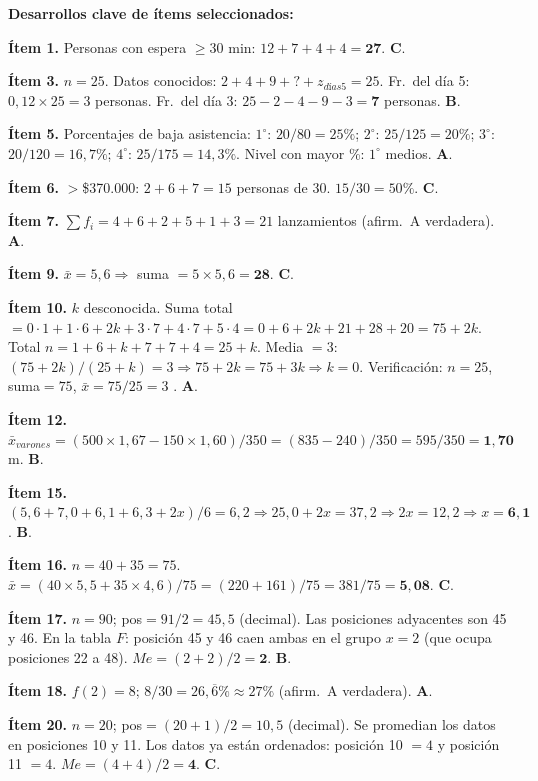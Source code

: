 \documentclass[11pt, letterpaper]{article}
\begin{document}
\medskip

\textbf{Desarrollos clave de ítems seleccionados:}

\medskip

\textbf{Ítem 1.} Personas con espera $\geq30$ min: $12+7+4+4=\mathbf{27}$. \textbf{C}.

\textbf{Ítem 3.} $n=25$. Datos conocidos: $2+4+9+?+z_{días5}=25$. Fr.\ del día 5: $0{,}12\times25=3$ personas. Fr.\ del día 3: $25-2-4-9-3=\mathbf{7}$ personas. \textbf{B}.

\textbf{Ítem 5.} Porcentajes de baja asistencia: $1^\circ$: $20/80=25\%$; $2^\circ$: $25/125=20\%$; $3^\circ$: $20/120=16{,}7\%$; $4^\circ$: $25/175=14{,}3\%$. Nivel con mayor \%: $1^\circ$ medios. \textbf{A}.

\textbf{Ítem 6.} $>$\$370.000: $2+6+7=15$ personas de 30. $15/30=50\%$. \textbf{C}.

\textbf{Ítem 7.} $\sum f_i = 4+6+2+5+1+3=21$ lanzamientos (afirm.\ A verdadera). \textbf{A}.

\textbf{Ítem 9.} $\bar{x}=5{,}6 \Rightarrow$ suma $=5\times5{,}6=\mathbf{28}$. \textbf{C}.

\textbf{Ítem 10.} $k$ desconocida. Suma total $= 0\cdot1+1\cdot6+2k+3\cdot7+4\cdot7+5\cdot4 = 0+6+2k+21+28+20=75+2k$. Total $n=1+6+k+7+7+4=25+k$. Media $=3$: $(75+2k)/(25+k)=3 \Rightarrow 75+2k=75+3k \Rightarrow k=0$. Verificación: $n=25$, suma$=75$, $\bar{x}=75/25=3$ \checkmark. \textbf{A}.

\textbf{Ítem 12.} $\bar{x}_{varones}=(500\times1{,}67-150\times1{,}60)/350=(835-240)/350=595/350=\mathbf{1{,}70}$ m. \textbf{B}.

\textbf{Ítem 15.} $(5{,}6+7{,}0+6{,}1+6{,}3+2x)/6=6{,}2 \Rightarrow 25{,}0+2x=37{,}2 \Rightarrow 2x=12{,}2 \Rightarrow x=\mathbf{6{,}1}$. \textbf{B}.

\textbf{Ítem 16.} $n=40+35=75$. $\bar{x}=(40\times5{,}5+35\times4{,}6)/75=(220+161)/75=381/75=\mathbf{5{,}08}$. \textbf{C}.

\textbf{Ítem 17.} $n=90$; pos$=91/2=45{,}5$ (decimal). Las posiciones adyacentes son 45 y 46. En la tabla $F$: posición 45 y 46 caen ambas en el grupo $x=2$ (que ocupa posiciones 22 a 48). $Me=(2+2)/2=\mathbf{2}$. \textbf{B}.

\textbf{Ítem 18.} $f(2)=8$; $8/30=26{,}\overline{6}\%\approx27\%$ (afirm.\ A verdadera). \textbf{A}.

\textbf{Ítem 20.} $n=20$; pos$=(20+1)/2=10{,}5$ (decimal). Se promedian los datos en posiciones 10 y 11. Los datos ya están ordenados: posición 10 $=4$ y posición 11 $=4$. $Me=(4+4)/2=\mathbf{4}$. \textbf{C}.
\end{document}
